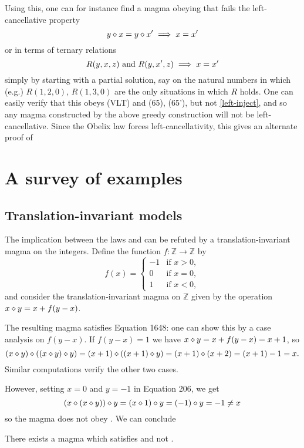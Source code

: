 Using this, one can for instance find a magma obeying  that fails the left-cancellative property
$$ y \diamond x = y \diamond x' \implies x=x'$$
or in terms of ternary relations
\begin{equation}\label{left-inject}
   R(y,x,z) \hbox{ and } R(y,x',z) \implies x=x'
\end{equation}
simply by starting with a partial solution, say on the natural numbers in which (e.g.) $R(1,2,0)$, $R(1,3,0)$ are the only situations in which $R$ holds.  One can easily verify that this obeys (VLT) and (65), (65'), but not \eqref{left-inject}, and so any magma constructed by the above greedy construction will not be left-cancellative.  Since the Obelix law  forces left-cancellativity, this gives an alternate proof of 


\section{A survey of examples}\label{infinite-examples-section}

\subsection{Translation-invariant models}

The implication between the laws  and  can be refuted by a translation-invariant
magma on the integers. Define the function $f: \mathbb{Z} \to \mathbb{Z}$ by
$$f(x) =
\begin{cases}
  -1  & \text{if } x > 0, \\
   0  & \text{if } x = 0, \\
   1  & \text{if } x < 0,
\end{cases}$$
and consider the translation-invariant magma on $\mathbb{Z}$ given by the operation $x \diamond y = x + f(y-x)$.

The resulting magma satisfies Equation 1648: one can show this by a case analysis on $f(y-x)$. If $f(y-x)=1$ we have $x \diamond y = x + f(y-x) = x + 1$, so
$$(x \diamond y) \diamond ((x \diamond y) \diamond y) = (x + 1) \diamond ((x + 1) \diamond y) = (x + 1) \diamond (x + 2) = (x + 1) - 1 = x.$$
Similar computations verify the other two cases.

However, setting $x=0$ and $y=-1$ in Equation 206, we get
$$(x \diamond (x \diamond y)) \diamond y = (x \diamond 1) \diamond y = (-1) \diamond y = -1 \neq x$$
so the magma does not obey . We can conclude

\begin{theorem}\label{non_imp_1648_206_thm}
  \leanok
  There exists a magma which satisfies  and not .
\end{theorem}


